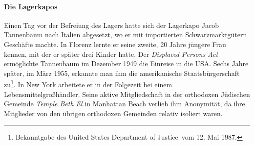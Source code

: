 \documentclass[a4paper,12pt,ngerman,
]{nisebook}
\begin{document}
\paragraph{Die Lagerkapos\label{kapos_ahndung}}
Einen Tag vor der Befreiung des Lagers hatte sich der Lagerkapo Jacob Tannenbaum nach Italien abgesetzt, wo er mit importierten Schwarzmarktgütern Geschäfte machte. In Florenz lernte er seine zweite, 20 Jahre jüngere Frau kennen, mit der er später drei Kinder hatte. Der \emph{Displaced Persons Act} ermöglichte Tannenbaum im Dezember 1949 die Einreise in die USA. Sechs Jahre später, im März 1955, erkannte man ihm die amerikanische Staatsbürgerschaft zu\footnote{Bekanntgabe des \glqq United States Department of Justice\grqq~vom 12. Mai 1987.}. 
In New York arbeitete er in der Folgezeit bei einem Lebensmittelgroßhändler. Seine aktive Mitgliedschaft in der orthodoxen Jüdischen Gemeinde \emph{Temple Beth El} in Manhattan Beach verlieh ihm Anonymität, da ihre Mitglieder von den übrigen orthodoxen Gemeinden relativ isoliert waren.\newline
\end{document}
